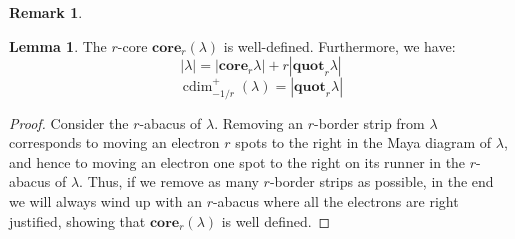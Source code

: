 \documentclass{amsart}[12pt]
\theoremstyle{definition}
\newtheorem{lemma}[dummy]{Lemma}
\newtheorem{remark}[dummy]{Remark}
\newcommand{\core}{\mathbf{core}}
\newcommand{\quot}{\mathbf{quot}}
\DeclareMathOperator{\cdim}{cdim}
\begin{document}
\begin{remark}





\begin{lemma}
The $r$-core $\core_r(\lambda)$ is well-defined.  Furthermore, we have:
$$|\lambda|=|\core_r{\lambda}|+r|\quot_r{\lambda}|$$
$$\cdim^+_{-1/r}(\lambda)=|\quot_r{\lambda}|$$
\end{lemma}

\begin{proof}


Consider the $r$-abacus of $\lambda$.  Removing an $r$-border strip from $\lambda$ corresponds to moving an electron $r$ spots to the right in the Maya diagram of $\lambda$, and hence to moving an electron one spot to the right on its runner in the $r$-abacus of $\lambda$.  Thus, if we remove as many $r$-border strips as possible, in the end we will always wind up with an $r$-abacus where all the electrons are right justified, showing that $\core_r(\lambda)$ is well defined.


\end{proof}
\end{remark}
\end{document}
